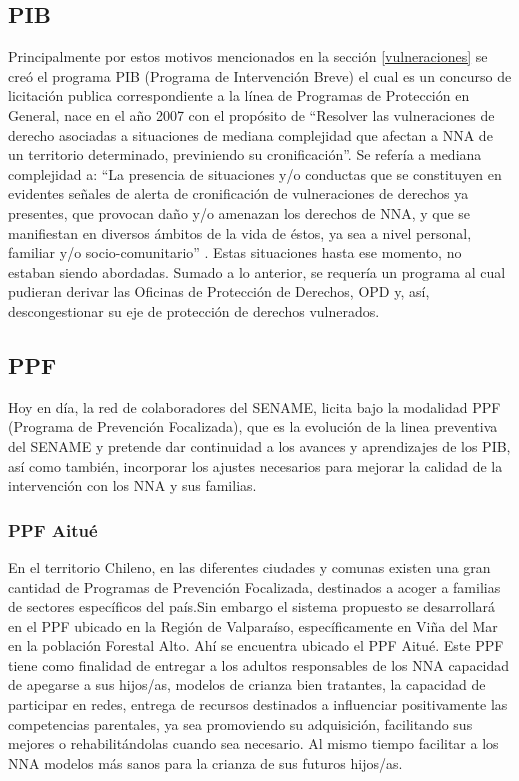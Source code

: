 \subsection{PIB}
\vspace{2mm}
\normalsize

Principalmente por estos motivos mencionados en la sección \ref{vulneraciones} se creó el  programa PIB (Programa de Intervención Breve) el cual es un concurso de licitación publica correspondiente a la línea de Programas de Protección en General, nace en el año 2007 con el propósito de “Resolver las vulneraciones de derecho asociadas a situaciones de mediana complejidad que afectan a NNA de un territorio determinado, previniendo su cronificación”. Se refería a mediana complejidad a: “La presencia de situaciones y/o conductas que se constituyen en evidentes señales de alerta de cronificación de vulneraciones de derechos ya presentes, que provocan daño y/o amenazan los derechos de NNA, y que se manifiestan en diversos ámbitos de la vida de éstos, ya sea a nivel personal, familiar y/o socio-comunitario” \cite{REF2} . Estas situaciones hasta ese momento, no estaban siendo abordadas. Sumado a lo anterior, se requería un programa al cual pudieran derivar las Oficinas de Protección de Derechos, OPD y, así, descongestionar su eje de protección de derechos vulnerados.

\subsection{PPF}
\vspace{2mm}
\normalsize

Hoy en día, la red de colaboradores del SENAME, licita bajo la modalidad PPF (Programa de Prevención Focalizada), que es la evolución de la linea preventiva del SENAME y pretende dar continuidad a los avances y aprendizajes de los PIB, así como también, incorporar los ajustes necesarios para mejorar la calidad de la intervención con los NNA y sus familias.

\subsubsection{PPF Aitué}
\label{ppf}
\vspace{2mm}
\normalsize
En el territorio Chileno, en las diferentes ciudades y comunas existen una gran cantidad de Programas de Prevención Focalizada, destinados a acoger a familias de sectores específicos del país.Sin embargo el sistema propuesto se desarrollará en el PPF ubicado en la Región de Valparaíso, específicamente en Viña del Mar en la población Forestal Alto. Ahí se encuentra ubicado el PPF Aitué. Este PPF tiene como finalidad de entregar a los adultos responsables de los NNA capacidad de apegarse a sus hijos/as, modelos de crianza bien tratantes, la capacidad de participar en redes, entrega de recursos destinados a influenciar positivamente las competencias parentales, ya sea promoviendo su adquisición, facilitando sus mejores o rehabilitándolas cuando sea necesario. Al mismo tiempo facilitar a los NNA modelos más sanos para la crianza de sus futuros hijos/as.\\

